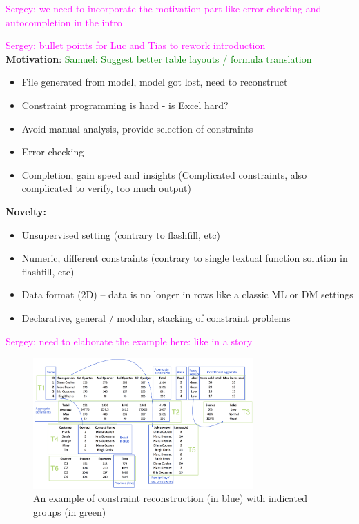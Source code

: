 \documentclass{ecai}
\newcommand{\sergey}[1]{\textcolor{magenta}{{\sc Sergey:} #1}\xspace}
\newcommand{\samuel}[1]{\textcolor{green}{{\sc Samuel:} #1}\xspace}
\begin{document}
\sergey{we need to incorporate the motivation part like error checking and autocompletion in the intro}

\sergey{bullet points for Luc and Tias to rework introduction}\\
\textbf{Motivation}:
\samuel{Suggest better table layouts / formula translation}
\begin{itemize}
  \item File generated from model, model got lost, need to reconstruct
  \item Constraint programming is hard - is Excel hard?
  \item Avoid manual analysis, provide selection of constraints
  \item Error checking
  \item Completion, gain speed and insights (Complicated constraints, also complicated to verify, too much output)
\end{itemize}

\textbf{Novelty:}
\begin{itemize}
  \item Unsupervised setting (contrary to flashfill, etc)
  \item Numeric, different constraints (contrary to single textual function solution in flashfill, etc)
  \item Data format (2D) -- data is no longer in rows like a classic ML or DM settings
  \item Declarative, general / modular, stacking of constraint problems 
\end{itemize}

\sergey{need to elaborate the example here: like in a story} 

\begin{figure}[tbh]
  \begin{center}
    \includegraphics[width=0.75\textwidth]{figures/Demo.png}
  \end{center}
  \vspace{-10pt}
  \caption{An example of constraint reconstruction (in blue) with indicated groups (in green)}
  \label{fig:main_example}
\end{figure}
\end{document}
